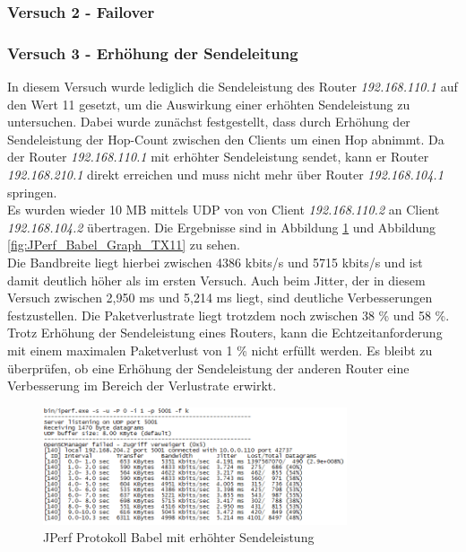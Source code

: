 \documentclass[10pt]{scrartcl}
\begin{document}
\subsubsection{Versuch 2 - Failover}

\subsubsection{Versuch 3 - Erhöhung der Sendeleitung}
In diesem Versuch wurde lediglich die Sendeleistung des Router \textit{192.168.110.1} auf den Wert 11 gesetzt, um die Auswirkung einer erhöhten Sendeleistung zu untersuchen. Dabei wurde zunächst festgestellt, dass durch Erhöhung der Sendeleistung der Hop-Count zwischen den Clients um einen Hop abnimmt. Da der Router \textit{192.168.110.1} mit erhöhter Sendeleistung sendet, kann er Router \textit{192.168.210.1} direkt erreichen und muss nicht mehr über Router \textit{192.168.104.1} springen.\\
Es wurden wieder 10 MB mittels UDP von von Client \textit{192.168.110.2} an Client \textit{192.168.104.2} übertragen. Die Ergebnisse sind in Abbildung \ref{fig:JPerf_Babel_Protokoll_TX11} und Abbildung \ref{fig:JPerf_Babel_Graph_TX11} zu sehen.\\
Die Bandbreite liegt hierbei zwischen 4386 kbits/s und 5715 kbits/s und ist damit deutlich höher als im ersten Versuch. Auch beim Jitter, der in diesem Versuch zwischen 2,950 ms und 5,214 ms liegt, sind deutliche Verbesserungen festzustellen. Die Paketverlustrate liegt trotzdem noch zwischen 38 \% und 58 \%.\\
Trotz Erhöhung der Sendeleistung eines Routers, kann die Echtzeitanforderung mit einem maximalen Paketverlust von 1 \% nicht erfüllt werden. Es bleibt zu überprüfen, ob eine Erhöhung der Sendeleistung der anderen Router eine Verbesserung im Bereich der Verlustrate erwirkt.

\begin{figure}[htbp]
	\centering	\includegraphics[width=0.8\textwidth]{Grafiken/Babel_TX11_Protokoll.png}
	\caption{JPerf Protokoll Babel mit erhöhter Sendeleistung}
	\label{fig:JPerf_Babel_Protokoll_TX11}
\end{figure}
\end{document}
